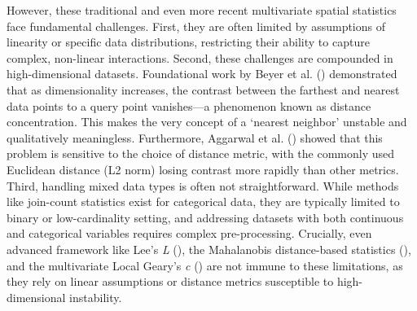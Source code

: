 \documentclass[
  a4paper,
  12pt]{article}
\begin{document}
However, these traditional and even more recent multivariate spatial
statistics face fundamental challenges. First, they are often limited by
assumptions of linearity or specific data distributions, restricting
their ability to capture complex, non-linear interactions. Second, these
challenges are compounded in high-dimensional datasets. Foundational
work by Beyer et al. () demonstrated that
as dimensionality increases, the contrast between the farthest and
nearest data points to a query point vanishes---a phenomenon known as
distance concentration. This makes the very concept of a `nearest
neighbor' unstable and qualitatively meaningless. Furthermore, Aggarwal
et al. () showed that this problem is
sensitive to the choice of distance metric, with the commonly used
Euclidean distance (L2 norm) losing contrast more rapidly than other
metrics. Third, handling mixed data types is often not straightforward.
While methods like join-count statistics exist for categorical data,
they are typically limited to binary or low-cardinality setting, and
addressing datasets with both continuous and categorical variables
requires complex pre-processing. Crucially, even advanced framework like
Lee's \emph{L} (), the Mahalanobis
distance-based statistics (), and the
multivariate Local Geary's \emph{c} () are not immune to these limitations, as they rely on linear
assumptions or distance metrics susceptible to high-dimensional
instability.
\end{document}
